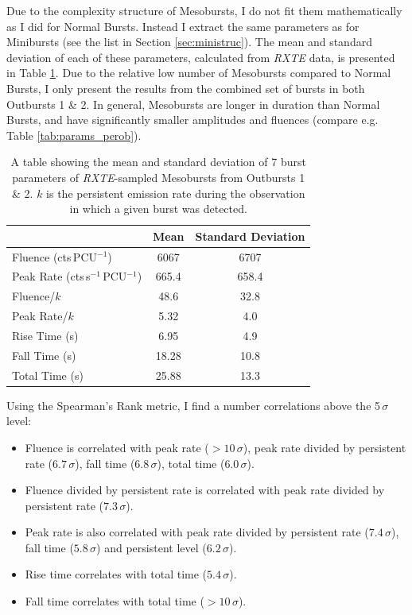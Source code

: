 \label{sec:mesostruc}

\par Due to the complexity structure of Mesobursts, I do not fit them mathematically as I did for Normal Bursts.  Instead I extract the same parameters as for Minibursts (see the list in Section \ref{sec:ministruc}).  The mean and standard deviation of each of these parameters, calculated from \textit{RXTE} data, is presented in Table \ref{tab:meso_param}.  Due to the relative low number of Mesobursts compared to Normal Bursts, I only present the results from the combined set of bursts in both Outbursts 1 \& 2.  In general, Mesobursts are longer in duration than Normal Bursts, and have significantly smaller amplitudes and fluences (compare e.g. Table \ref{tab:params_perob}).

\begin{table}
\centering
\begin{tabular}{l c c}
\hline
\hline
&Mean&Standard Deviation\\
\hline
Fluence \scriptsize(cts\,PCU$^{-1}$)&6067&6707\\
Peak Rate \scriptsize(cts\,s$^{-1}$\,PCU$^{-1}$)&665.4&658.4\\
Fluence/$k$&48.6&32.8\\
Peak Rate/$k$&5.32&4.0\\
Rise Time \scriptsize(s)&6.95&4.9\\
Fall Time \scriptsize(s)&18.28&10.8\\
Total Time \scriptsize(s)&25.88&13.3\\
\hline
\hline
\end{tabular}
\caption[A table showing the mean and standard deviation of 7 burst parameters of \textit{RXTE}-sampled Mesobursts from Outbursts 1 \& 2.]{A table showing the mean and standard deviation of 7 burst parameters of \textit{RXTE}-sampled Mesobursts from Outbursts 1 \& 2.  $k$ is the persistent emission rate during the observation in which a given burst was detected.}
\label{tab:meso_param}
\end{table}

\par Using the Spearman's Rank metric, I find a number correlations above the 5$\,\sigma$ level:
\begin{itemize}
\item Fluence is correlated with peak rate ($>10\,\sigma$), peak rate divided by persistent rate ($6.7\,\sigma$), fall time ($6.8\,\sigma$), total time ($6.0\,\sigma$).
\item Fluence divided by persistent rate is correlated with peak rate divided by persistent rate ($7.3\,\sigma$).
\item Peak rate is also correlated with peak rate divided by persistent rate ($7.4\,\sigma$), fall time ($5.8\,\sigma$) and persistent level ($6.2\,\sigma$).
\item Rise time correlates with total time ($5.4\,\sigma$).
\item Fall time correlates with total time ($>10\,\sigma$).
\end{itemize}

